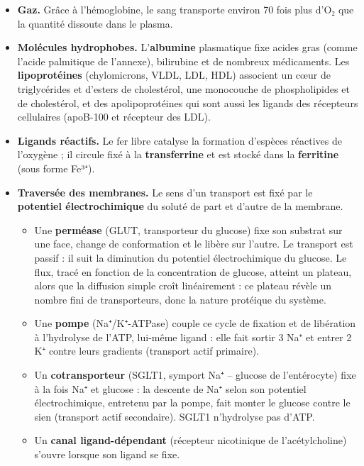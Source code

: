 \documentclass[11pt,a4paper]{article}
\providecommand{\tightlist}{\setlength{\itemsep}{0pt}\setlength{\parskip}{0pt}}
\begin{document}
\begin{itemize}
\tightlist
\item
  \textbf{Gaz.} Grâce à l'hémoglobine, le sang transporte environ 70 fois plus d'O₂ que la quantité dissoute dans le plasma.
\item
  \textbf{Molécules hydrophobes.} L'\textbf{albumine} plasmatique fixe acides gras (comme l'acide palmitique de l'annexe), bilirubine et de nombreux médicaments. Les \textbf{lipoprotéines} (chylomicrons, VLDL, LDL, HDL) associent un cœur de triglycérides et d'esters de cholestérol, une monocouche de phospholipides et de cholestérol, et des apolipoprotéines qui sont aussi les ligands des récepteurs cellulaires (apoB-100 et récepteur des LDL).
\item
  \textbf{Ligands réactifs.} Le fer libre catalyse la formation d'espèces réactives de l'oxygène ; il circule fixé à la \textbf{transferrine} et est stocké dans la \textbf{ferritine} (sous forme Fe³⁺).
\item
  \textbf{Traversée des membranes.} Le sens d'un transport est fixé par le \textbf{potentiel électrochimique} du soluté de part et d'autre de la membrane.

  \begin{itemize}
  \tightlist
  \item
    Une \textbf{perméase} (GLUT, transporteur du glucose) fixe son substrat sur une face, change de conformation et le libère sur l'autre. Le transport est passif : il suit la diminution du potentiel électrochimique du glucose. Le flux, tracé en fonction de la concentration de glucose, atteint un plateau, alors que la diffusion simple croît linéairement : ce plateau révèle un nombre fini de transporteurs, donc la nature protéique du système.
  \item
    Une \textbf{pompe} (Na⁺/K⁺-ATPase) couple ce cycle de fixation et de libération à l'hydrolyse de l'ATP, lui-même ligand : elle fait sortir 3 Na⁺ et entrer 2 K⁺ contre leurs gradients (transport actif primaire).
  \item
    Un \textbf{cotransporteur} (SGLT1, symport Na⁺ -- glucose de l'entérocyte) fixe à la fois Na⁺ et glucose : la descente de Na⁺ selon son potentiel électrochimique, entretenu par la pompe, fait monter le glucose contre le sien (transport actif secondaire). SGLT1 n'hydrolyse pas d'ATP.
  \item
    Un \textbf{canal ligand-dépendant} (récepteur nicotinique de l'acétylcholine) s'ouvre lorsque son ligand se fixe.
  \end{itemize}
\end{itemize}
\end{document}
